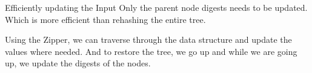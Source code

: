 \begin{slide}{Efficiently updating the Input}
Only the parent node digests needs to be updated. Which is more efficient than rehashing the entire tree.

Using the Zipper, we can traverse through the data structure and update the values where needed. And to restore the tree, we go up and while we are going up, we update the digests of the nodes.
\end{slide}







